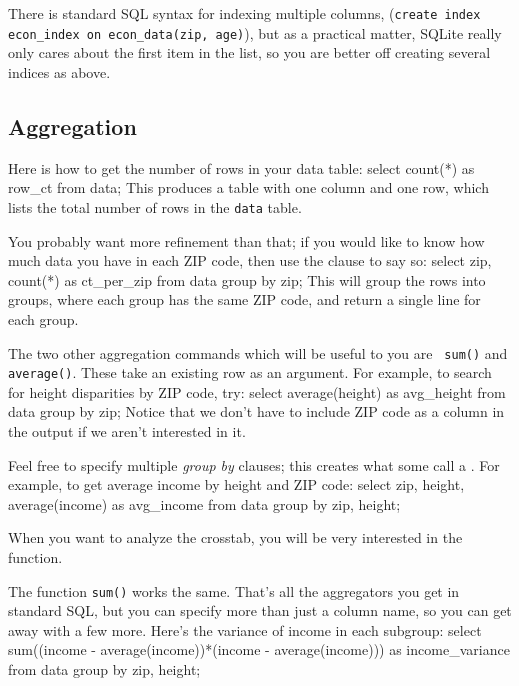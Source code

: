 There is standard SQL syntax for indexing multiple columns, 
({\tt create index econ\_index on econ\_data(zip, age)}), but as a
practical matter, SQLite really only cares about the first item in the
list, so you are better off creating several indices as above.

\subsection{Aggregation}
Here is how to get the number of rows in your data table:
select count(*) as row_ct 
from data;
This produces a table with one column and one row, which lists the total number of rows in the {\tt data} table.

You probably want more refinement than that; if you would like to
know how much data you have in each ZIP code, then use the  clause to say so:
select zip, count(*) as ct_per_zip
from data
group by zip;
This will group the rows into groups, where each group has the same ZIP
code, and return a single line for each group.


The two other aggregation commands which will be useful to you are {\tt
sum()} and {\tt average()}. These take an existing row as an argument.
For example, to search for height disparities by ZIP code, try:
select  average(height) as avg_height
from data
group by zip;
Notice that we don't have to include ZIP code as a column in the output
if we aren't interested in it.

Feel free to specify multiple {\sl group by} clauses; this creates what
some call a . For example, to get average income by
height and ZIP code: 
select  zip, height, average(income) as avg_income
from data
group by zip, height;

When you want to analyze the crosstab, you will be very
interested in the  function.

The function {\tt sum()} works the same. That's all the aggregators you
get in standard SQL, but you can specify more than just a column name, so you can get
away with a few more. Here's the variance of income in each subgroup:
select  sum((income - average(income))*(income - average(income))) 
               as income_variance
from data
group by zip, height;

